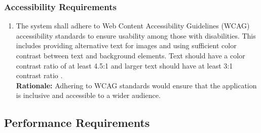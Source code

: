 \documentclass[]{article}
\begin{document}
\subsubsection{Accessibility Requirements}
\label{ssub:accessibility_requirements}
\begin{enumerate}[{UH-A}1. ]
    \item The system shall adhere to Web Content Accessibility Guidelines (WCAG) accessibility standards to ensure usability among those with disabilities. This includes providing 
    alternative text for images and using sufficient color contrast between text and background elements. Text should have a color contrast ratio of at least 4.5:1 and larger text should
    have at least 3:1 contrast ratio \cite{2c}. \\
    {\bf Rationale:} Adhering to WCAG standards would ensure that the application is inclusive and accessible to a wider audience.
\end{enumerate} 



\subsection{Performance Requirements}
\label{sub:performance_requirements}
\end{document}
